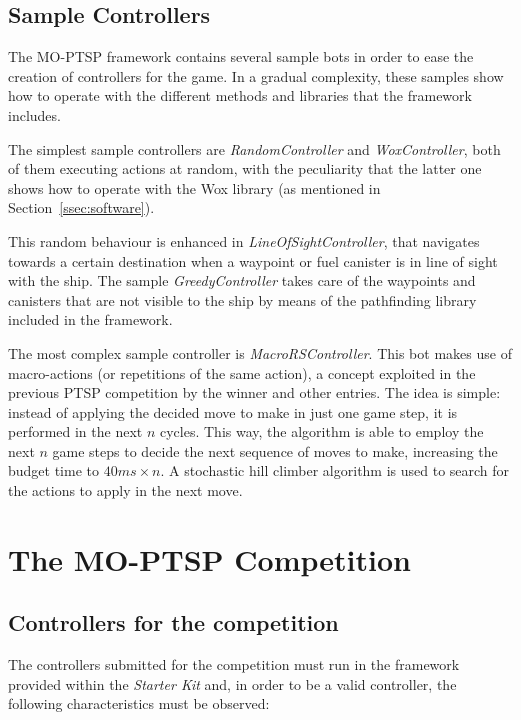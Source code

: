 \documentclass[conference]{IEEEtran}
\begin{document}
\subsection{Sample Controllers} \label{ssec:sample} 

The MO-PTSP framework contains several sample bots in order to ease the creation of controllers for the game. In a gradual complexity, these samples show how to operate with the different methods and libraries that the framework includes.

The simplest sample controllers are \textit{RandomController} and \textit{WoxController}, both of them executing actions at random, with the peculiarity that the latter one shows how to operate with the Wox library (as mentioned in Section~\ref{ssec:software}).

This random behaviour is enhanced in \textit{LineOfSightController}, that navigates towards a certain destination when a waypoint or fuel canister is in line of sight with the ship. The sample \textit{GreedyController} takes care of the waypoints and canisters that are not visible to the ship by means of the pathfinding library included in the framework.

The most complex sample controller is \textit{MacroRSController}. This bot makes use of macro-actions (or repetitions of the same action), a concept exploited in the previous PTSP competition by the winner and other entries. The idea is simple: instead of applying the decided move to make in just one game step, it is performed in the next $n$ cycles. This way, the algorithm is able to employ the next $n$ game steps to decide the next sequence of moves to make, increasing the budget time to $40ms \times n$. A stochastic hill climber algorithm is used to search for the actions to apply in the next move.

\section{The MO-PTSP Competition} \label{sec:comp}

\subsection{Controllers for the competition}

The controllers submitted for the competition must run in the framework provided within the \textit{Starter Kit} and, in order to be a valid controller, the following characteristics must be observed:
\end{document}
